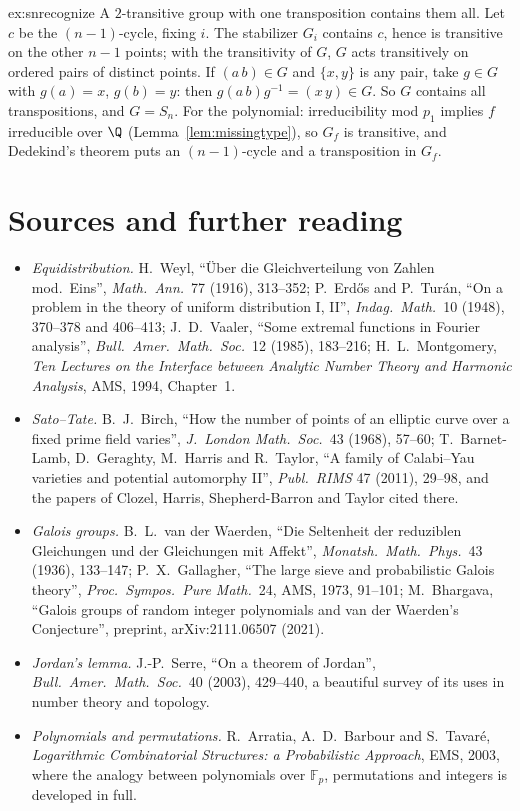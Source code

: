 \begin{solution}{ex:snrecognize}
\idea A $2$-transitive group with one transposition contains them all.
\writeup Let $c$ be the $(n-1)$-cycle, fixing $i$. The stabilizer $G_i$ contains $c$, hence is transitive on the other $n-1$ points; with the transitivity of $G$, $G$ acts transitively on ordered pairs of distinct points. If $(a\,b)\in G$ and $\{x,y\}$ is any pair, take $g\in G$ with $g(a)=x$, $g(b)=y$: then $g(a\,b)g^{-1}=(x\,y)\in G$. So $G$ contains all transpositions, and $G=S_n$. For the polynomial: irreducibility mod $p_1$ implies $f$ irreducible over $\Q$ (Lemma~\ref{lem:missingtype}), so $G_f$ is transitive, and Dedekind's theorem puts an $(n-1)$-cycle and a transposition in $G_f$.
\end{solution}

\section*{Sources and further reading}

\begin{itemize}
\item \emph{Equidistribution.} H.~Weyl, ``Über die Gleichverteilung von Zahlen mod.\ Eins'', \emph{Math.\ Ann.}\ 77 (1916), 313--352; P.~Erd\H{o}s and P.~Turán, ``On a problem in the theory of uniform distribution I, II'', \emph{Indag.\ Math.}\ 10 (1948), 370--378 and 406--413; J.~D.~Vaaler, ``Some extremal functions in Fourier analysis'', \emph{Bull.\ Amer.\ Math.\ Soc.}\ 12 (1985), 183--216; H.~L.~Montgomery, \emph{Ten Lectures on the Interface between Analytic Number Theory and Harmonic Analysis}, AMS, 1994, Chapter~1.
\item \emph{Sato--Tate.} B.~J.~Birch, ``How the number of points of an elliptic curve over a fixed prime field varies'', \emph{J.\ London Math.\ Soc.}\ 43 (1968), 57--60; T.~Barnet-Lamb, D.~Geraghty, M.~Harris and R.~Taylor, ``A family of Calabi--Yau varieties and potential automorphy II'', \emph{Publ.\ RIMS} 47 (2011), 29--98, and the papers of Clozel, Harris, Shepherd-Barron and Taylor cited there.
\item \emph{Galois groups.} B.~L.~van der Waerden, ``Die Seltenheit der reduziblen Gleichungen und der Gleichungen mit Affekt'', \emph{Monatsh.\ Math.\ Phys.}\ 43 (1936), 133--147; P.~X.~Gallagher, ``The large sieve and probabilistic Galois theory'', \emph{Proc.\ Sympos.\ Pure Math.}\ 24, AMS, 1973, 91--101; M.~Bhargava, ``Galois groups of random integer polynomials and van der Waerden's Conjecture'', preprint, arXiv:2111.06507 (2021).
\item \emph{Jordan's lemma.} J.-P.~Serre, ``On a theorem of Jordan'', \emph{Bull.\ Amer.\ Math.\ Soc.}\ 40 (2003), 429--440, a beautiful survey of its uses in number theory and topology.
\item \emph{Polynomials and permutations.} R.~Arratia, A.~D.~Barbour and S.~Tavaré, \emph{Logarithmic Combinatorial Structures: a Probabilistic Approach}, EMS, 2003, where the analogy between polynomials over $\mathbb F_p$, permutations and integers is developed in full.
\end{itemize}

